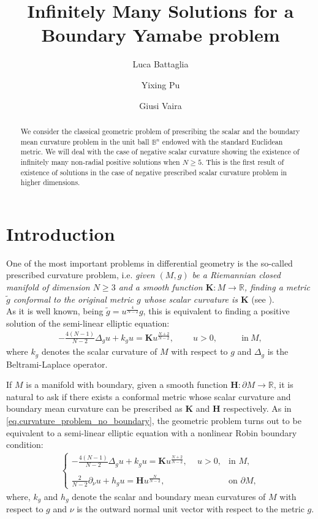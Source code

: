 \documentclass[11pt,a4paper]{amsart}
\title{Infinitely Many Solutions for a Boundary Yamabe problem}
\author[L. Battaglia]{Luca Battaglia}
\author[Y. Pu]{Yixing Pu}
\author[G. Vaira]{Giusi Vaira}
\date{}
\begin{document}
\allowdisplaybreaks{}
\everymath{\displaystyle}


\maketitle

\begin{abstract}
We consider the classical geometric problem of prescribing the scalar and the boundary mean curvature problem in  the unit ball $\mathbb{B}^n$ endowed with the standard Euclidean metric. We will deal with the case of negative scalar curvature showing the existence of infinitely many non-radial positive solutions when $N\geq 5$. This is the first result of existence of solutions in the case of negative prescribed scalar curvature problem in higher dimensions.
\end{abstract}

\section{Introduction}
One of the most important problems in differential geometry is the so-called prescribed curvature problem, i.e.  {\em given $(M,g)$ be a Riemannian closed manifold of dimension $N\ge3$ and a smooth function $\mathbf{K}:M\to\mathbb R$, finding a metric $\tilde g$ conformal to the original metric $g$ whose scalar curvature is $\mathbf{K}$} (see \cite{SchoenYau_1994,ChenLi_2010,Hebey_2000,KazdanWarner_1974}).\\  As it is well known, being $\tilde g=u^{\frac4{N-2}}g$, this is equivalent to finding a positive solution of the semi-linear elliptic equation:
\begin{align}\label{eq.curvature_problem_no_boundary}
-\frac{4(N-1)}{N-2}\Delta_gu+k_gu=\mathbf{K}u^{\frac{N+2}{N-2}},\qquad~ u>0,\qquad&\text{in}~M,
\end{align}
where $k_g$ denotes the scalar curvature of $M$ with respect to $g$ and $\Delta_g$ is the Beltrami-Laplace operator.

If $M$ is a manifold with boundary, given a smooth function $\mathbf{H}:\partial M\to\mathbb R$, it is natural to ask if there exists a conformal metric whose scalar curvature and boundary mean curvature can be prescribed as $\mathbf{K}$ and $\mathbf{H}$ respectively. As in \eqref{eq.curvature_problem_no_boundary}, the geometric problem turns out to be equivalent to a semi-linear elliptic equation with a nonlinear Robin boundary condition:
\begin{align}\label{eq.basicly_original}
\left\{\begin{array}{ll}
-\frac{4(N-1)}{N-2}\Delta_gu+k_gu=\mathbf{K}u^{\frac{N+2}{N-2}},\,\quad u>0,&\text{in }M,\\\\\frac2{N-2}\partial_\nu u+h_gu=\mathbf{H}u^{\frac N{N-2}},&\text{on }\partial M,
\end{array}\right.
\end{align}
where, $k_g$ and $h_g$ denote the scalar and boundary mean curvatures of $M$ with respect to $g$ and $\nu$ is the outward normal unit vector with respect to the metric $g$.
\end{document}
